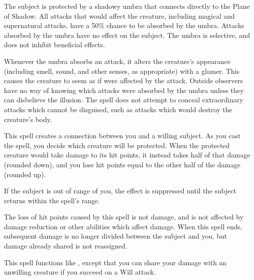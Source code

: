\spellrng{\rngclose}
\spelldur{\durshort}
\begin{spelleffect}
    The subject is protected by a shadowy umbra that connects directly to the Plane of Shadow. All attacks that would affect the creature, including magical and supernatural attacks, have a 50\% chance to be absorbed by the umbra. Attacks absorbed by the umbra have no effect on the subject. The umbra is selective, and does not inhibit beneficial effects.
    
    Whenever the umbra absorbs an attack, it alters the creature's appearance (including smell, sound, and other senses, as appropriate) with a glamer. This causes the creature to seem as if were affected by the attack. Outside observers have no way of knowing which attacks were absorbed by the umbra unless they can disbelieve the illusion. The spell does not attempt to conceal extraordinary attacks which cannot be disguised, such as attacks which would destroy the creature's body.
\end{spelleffect}

\spellrng{\rngmed}
\begin{spelleffect}
  This spell creates a connection between you and a willing subject. As you cast the spell, you decide which creature will be protected. When the protected creature would take damage to its hit points, it instead takes half of that damage (rounded down), and you lose hit points equal to the other half of the damage (rounded up).

  If the subject is out of range of you, the effect is suppressed until the subject returns within the spell's range.
\end{spelleffect}
\begin{spellnotes}
  The loss of hit points caused by this spell is not damage, and is not affected by damage reduction or other abilities which affect damage. When this spell ends, subsequent damage is no longer divided between the subject and you, but damage already shared is not reassigned.
\end{spellnotes}

\begin{spelleffect}
  This spell functions like , except that you can share your damage with an unwilling creature if you succeed on a Will attack.
\end{spelleffect}

